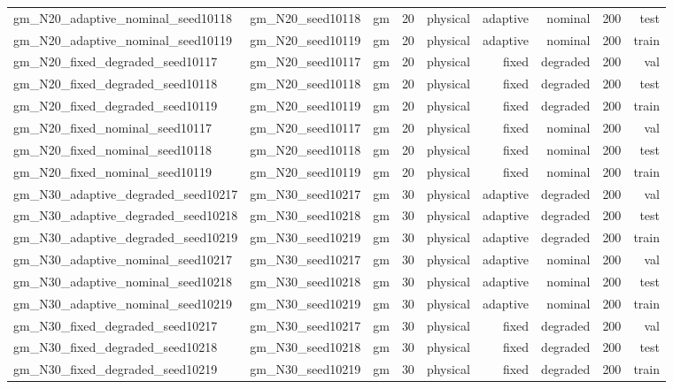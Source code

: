 \begin{tabular}{lrrrrrrrr}
gm\_N20\_adaptive\_nominal\_seed10118 & gm\_N20\_seed10118 & gm & 20 & physical & adaptive & nominal & 200 & test \\
gm\_N20\_adaptive\_nominal\_seed10119 & gm\_N20\_seed10119 & gm & 20 & physical & adaptive & nominal & 200 & train \\
gm\_N20\_fixed\_degraded\_seed10117 & gm\_N20\_seed10117 & gm & 20 & physical & fixed & degraded & 200 & val \\
gm\_N20\_fixed\_degraded\_seed10118 & gm\_N20\_seed10118 & gm & 20 & physical & fixed & degraded & 200 & test \\
gm\_N20\_fixed\_degraded\_seed10119 & gm\_N20\_seed10119 & gm & 20 & physical & fixed & degraded & 200 & train \\
gm\_N20\_fixed\_nominal\_seed10117 & gm\_N20\_seed10117 & gm & 20 & physical & fixed & nominal & 200 & val \\
gm\_N20\_fixed\_nominal\_seed10118 & gm\_N20\_seed10118 & gm & 20 & physical & fixed & nominal & 200 & test \\
gm\_N20\_fixed\_nominal\_seed10119 & gm\_N20\_seed10119 & gm & 20 & physical & fixed & nominal & 200 & train \\
gm\_N30\_adaptive\_degraded\_seed10217 & gm\_N30\_seed10217 & gm & 30 & physical & adaptive & degraded & 200 & val \\
gm\_N30\_adaptive\_degraded\_seed10218 & gm\_N30\_seed10218 & gm & 30 & physical & adaptive & degraded & 200 & test \\
gm\_N30\_adaptive\_degraded\_seed10219 & gm\_N30\_seed10219 & gm & 30 & physical & adaptive & degraded & 200 & train \\
gm\_N30\_adaptive\_nominal\_seed10217 & gm\_N30\_seed10217 & gm & 30 & physical & adaptive & nominal & 200 & val \\
gm\_N30\_adaptive\_nominal\_seed10218 & gm\_N30\_seed10218 & gm & 30 & physical & adaptive & nominal & 200 & test \\
gm\_N30\_adaptive\_nominal\_seed10219 & gm\_N30\_seed10219 & gm & 30 & physical & adaptive & nominal & 200 & train \\
gm\_N30\_fixed\_degraded\_seed10217 & gm\_N30\_seed10217 & gm & 30 & physical & fixed & degraded & 200 & val \\
gm\_N30\_fixed\_degraded\_seed10218 & gm\_N30\_seed10218 & gm & 30 & physical & fixed & degraded & 200 & test \\
gm\_N30\_fixed\_degraded\_seed10219 & gm\_N30\_seed10219 & gm & 30 & physical & fixed & degraded & 200 & train \\

\end{tabular}
